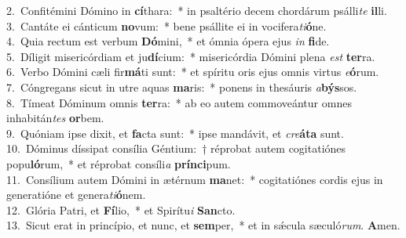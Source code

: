 {2.~}Confitémini Dómino in \textbf{cí}thara:~* in psaltério decem chordárum psálli\textit{te} \textbf{il}li.\\
{3.~}Cantáte ei cánticum \textbf{no}vum:~* bene psállite ei in vocifera\textit{ti}\textbf{ó}ne.\\
{4.~}Quia rectum est verbum \textbf{Dó}mini,~* et ómnia ópera ejus \textit{in} \textbf{fi}de.\\
{5.~}Díligit misericórdiam et ju\textbf{dí}cium:~* misericórdia Dómini plena \textit{est} \textbf{ter}ra.\\
{6.~}Verbo Dómini cæli fir\textbf{má}ti sunt:~* et spíritu oris ejus omnis virtus \textit{e}\textbf{ó}rum.\\
{7.~}Cóngregans sicut in utre aquas \textbf{ma}ris:~* ponens in thesáuris \textit{a}\textbf{býs}sos.\\
{8.~}Tímeat Dóminum omnis \textbf{ter}ra:~* ab eo autem commoveántur omnes inhabitán\textit{tes} \textbf{or}bem.\\
{9.~}Quóniam ipse dixit, et \textbf{fa}cta sunt:~* ipse mandávit, et \textit{cre}\textbf{á}\textbf{ta} sunt.\\
{10.~}Dóminus díssipat consília Géntium:~† réprobat autem cogitatiónes popu\textbf{ló}rum,~* et réprobat consíli\textit{a} \textbf{prín}\textbf{ci}pum.\\
{11.~}Consílium autem Dómini in ætérnum \textbf{ma}net:~* cogitatiónes cordis ejus in generatióne et genera\textit{ti}\textbf{ó}nem.\\
{12.~}Glória Patri, et \textbf{Fí}lio,~* et Spirítu\textit{i} \textbf{San}cto.\\
{13.~}Sicut erat in princípio, et nunc, et \textbf{sem}per,~* et in sǽcula sæculó\textit{rum}. \textbf{A}men.\\
